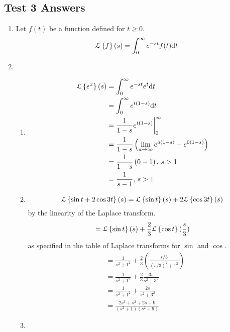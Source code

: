 \subsection{Test 3 Answers}

\begin{enumerate}[label=\arabic*.]
	\item
		Let $f(t)$ be a function defined for $t \geq 0$.
		\begin{equation*}
			\mathcal{L}\left\{ f \right\}\left(s\right) = \int_{0}^{\infty}{e^{-st}f(t) \mathrm{d}t}
		\end{equation*}
	\item
		\begin{enumerate}[label = (\alph*)]
			\item
				\begin{align*}
					\mathcal{L}\left\{ e^{x} \right\}\left(s\right) &= \int_{0}^{\infty}{e^{-st}e^{t} \mathrm{d}t} \\
					&= \int_{0}^{\infty}{e^{t(1-s)} \mathrm{d}t} \\
					&= \frac{1}{1-s}e^{t(1-s)} \bigg\rvert_{0}^{\infty} \\
					&= \frac{1}{1-s}\left(\lim_{a \to \infty}{e^{a(1-s)}} - e^{0(1-s)} \right) \\
					&= \frac{1}{1-s}\left(0 - 1\right) \text{, }  s > 1\\
					&= \frac{1}{s-1} \text{, } s > 1
				\end{align*}		
			\item
				\begin{equation*}
					\mathcal{L}\left\{ \sin{t} + 2\cos{3t} \right\}\left(s\right) = \mathcal{L}\left\{ \sin{t} \right\}\left(s\right) + 2\mathcal{L}\left\{ \cos{3t} \right\}\left(s\right)
				\end{equation*}
				by the linearity of the Laplace transform.
				\begin{equation*}
					 = \mathcal{L}\left\{ \sin{t} \right\}\left(s\right) + \frac{2}{3}\mathcal{L}\left\{\cos{t}\right\}{(\frac{s}{3})}
				\end{equation*}
				as specified in the table of Laplace transforms for $\sin$ and $\cos$.
				\begin{align*}
					&= \frac{1}{s^2 + 1^2} + \frac{2}{3}\left(\frac{s/3}{(s/3)^2 + 1^2}\right) \\
					&= \frac{1}{s^2 + 1^2} + \frac{2}{3}\frac{3s}{s^2 + 3^2} \\
					&= \frac{1}{s^2+1^2} + \frac{2s}{s^2 + 3^2} \\
					&= \frac{2s^3 + s^2 + 2s + 9}{\left(s^2 + 1\right)\left(s^2+9\right)}
				\end{align*}
			\item
				\begin{equation*}

\end{equation*}
\end{enumerate}
\end{enumerate}
